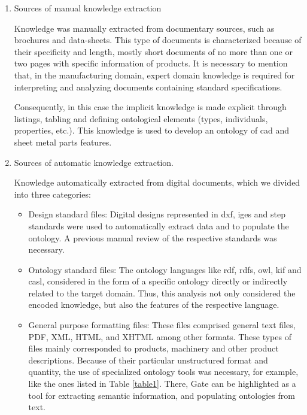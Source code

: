 \begin{enumerate}
	
	\item Sources of manual knowledge extraction
	
	Knowledge was manually extracted from documentary sources, such as brochures and data-sheets. This type of documents is characterized because of their specificity  and length, mostly short documents of no more than one or two pages with specific information of products. It is necessary to mention that, in the manufacturing domain, expert domain knowledge is required for interpreting and analyzing  documents containing standard specifications.   
	
	Consequently, in this case the implicit knowledge is made explicit through listings, tabling and defining ontological elements (types, individuals, properties, etc.). This knowledge is used to develop an ontology of \gls{cad} and sheet metal parts features. 
	
	\item Sources of  automatic knowledge extraction.
	
	Knowledge automatically extracted from digital documents, which we divided into three categories:
	
	\begin{itemize}
		\item Design standard files: Digital designs represented in \gls{dxf}, \gls{iges} and \gls{step} standards were used to automatically extract data and to populate the ontology. A previous manual review of the respective standards was necessary. 
		
		\item Ontology standard files: The ontology   languages like \gls{rdf}, \gls{rdfs}, \gls{owl}, \gls{kif} and \gls{casl}, considered in the form of a specific ontology directly or indirectly related to the target domain. Thus, this analysis not only considered the encoded knowledge, but also the features of the respective language.
		
		\item General purpose formatting files: These files comprised general  text    files, PDF, XML, HTML, and XHTML among other formats. These types of files mainly corresponded to products, machinery and other product descriptions. Because of their particular unstructured format and quantity, the use of specialized ontology tools was necessary, for example, like the ones listed in Table \ref{table1}. There, Gate can be highlighted as a tool for extracting semantic information, and populating ontologies from text.   
		
	\end{itemize}
	
\end{enumerate}


